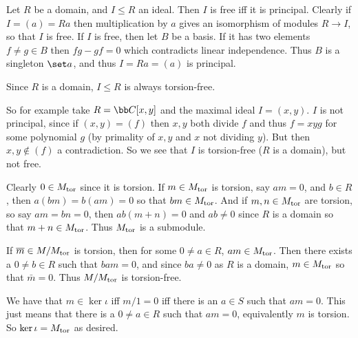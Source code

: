         \item Let $R$ be a domain, and $I\leq R$ an ideal.
        Then $I$ is free iff it is principal.
        Clearly if $I=(a)=Ra$ then multiplication by $a$ gives an isomorphism of modules $R\to I$, so that $I$ is free.
        If $I$ is free, then let $B$ be a basis.
        If it has two elements $f\neq g\in B$ then $fg-gf=0$ which contradicts linear independence.
        Thus $B$ is a singleton $\set a$, and thus $I=Ra=(a)$ is principal.

        Since $R$ is a domain, $I\leq R$ is always torsion-free.

        So for example take $R=\bC[x,y]$ and the maximal ideal $I=(x,y)$.
        $I$ is not principal, since if $(x,y)=(f)$ then $x,y$ both divide $f$ and thus $f=xyg$ for some polynomial $g$ (by primality of $x,y$ and $x$ not dividing $y$).
        But then $x,y\notin(f)$ a contradiction.
        So we see that $I$ is torsion-free ($R$ is a domain), but not free.
    \eenum

    \item
    \benum
        \item Clearly $0\in M_{\rm tor}$ since it is torsion.
        If $m\in M_{\rm tor}$ is torsion, say $am=0$, and $b\in R$, then $a(bm)=b(am)=0$ so that $bm\in M_{\rm tor}$.
        And if $m,n\in M_{\rm tor}$ are torsion, so say $am=bn=0$, then $ab(m+n)=0$ and $ab\neq0$ since $R$ is a domain so that $m+n\in M_{\rm tor}$.
        Thus $M_{\rm tor}$ is a submodule.

        \item If ${\overline{m}}\in M/M_{\rm tor}$ is torsion, then for some $0\neq a\in R$, $am\in M_{\rm tor}$.
        Then there exists a $0\neq b\in R$ such that $bam=0$, and since $ba\neq0$ as $R$ is a domain, $m\in M_{\rm tor}$ so that $\bar m=0$.
        Thus $M/M_{\rm tor}$ is torsion-free.

        \item We have that $m\in\ker\iota$ iff $m/1=0$ iff there is an $a\in S$ such that $am=0$.
        This just means that there is a $0\neq a\in R$ such that $am=0$, equivalently $m$ is torsion.
        So $\mathop{\rm ker}\iota=M_{\rm tor}$ as desired.
    \eenum
\eenum

